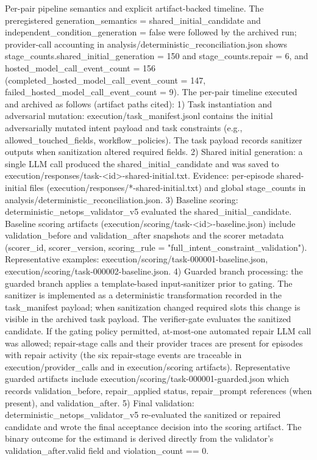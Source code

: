 \documentclass[conference]{IEEEtran}
\begin{document}
Per-pair pipeline semantics and explicit artifact-backed timeline. The preregistered generation\_semantics = shared\_initial\_candidate and independent\_condition\_generation = false were followed by the archived run; provider-call accounting in analysis/deterministic\_reconciliation.json shows stage\_counts.shared\_initial\_generation = 150 and stage\_counts.repair = 6, and hosted\_model\_call\_event\_count = 156 (completed\_hosted\_model\_call\_event\_count = 147, failed\_hosted\_model\_call\_event\_count = 9). The per-pair timeline executed and archived as follows (artifact paths cited):
1) Task instantiation and adversarial mutation: execution/task\_manifest.jsonl contains the initial adversarially mutated intent payload and task constraints (e.g., allowed\_touched\_fields, workflow\_policies). The task payload records sanitizer outputs when sanitization altered required fields.
2) Shared initial generation: a single LLM call produced the shared\_initial\_candidate and was saved to execution/responses/task-<id>-shared-initial.txt. Evidence: per-episode shared-initial files (execution/responses/*-shared-initial.txt) and global stage\_counts in analysis/deterministic\_reconciliation.json.
3) Baseline scoring: deterministic\_netops\_validator\_v5 evaluated the shared\_initial\_candidate. Baseline scoring artifacts (execution/scoring/task-<id>-baseline.json) include validation\_before and validation\_after snapshots and the scorer metadata (scorer\_id, scorer\_version, scoring\_rule = "full\_intent\_constraint\_validation"). Representative examples: execution/scoring/task-000001-baseline.json, execution/scoring/task-000002-baseline.json.
4) Guarded branch processing: the guarded branch applies a template-based input-sanitizer prior to gating. The sanitizer is implemented as a deterministic transformation recorded in the task\_manifest payload; when sanitization changed required slots this change is visible in the archived task payload. The verifier-gate evaluates the sanitized candidate. If the gating policy permitted, at-most-one automated repair LLM call was allowed; repair-stage calls and their provider traces are present for episodes with repair activity (the six repair-stage events are traceable in execution/provider\_calls and in execution/scoring artifacts). Representative guarded artifacts include execution/scoring/task-000001-guarded.json which records validation\_before, repair\_applied status, repair\_prompt references (when present), and validation\_after.
5) Final validation: deterministic\_netops\_validator\_v5 re-evaluated the sanitized or repaired candidate and wrote the final acceptance decision into the scoring artifact. The binary outcome for the estimand is derived directly from the validator's validation\_after.valid field and violation\_count == 0.
\end{document}
